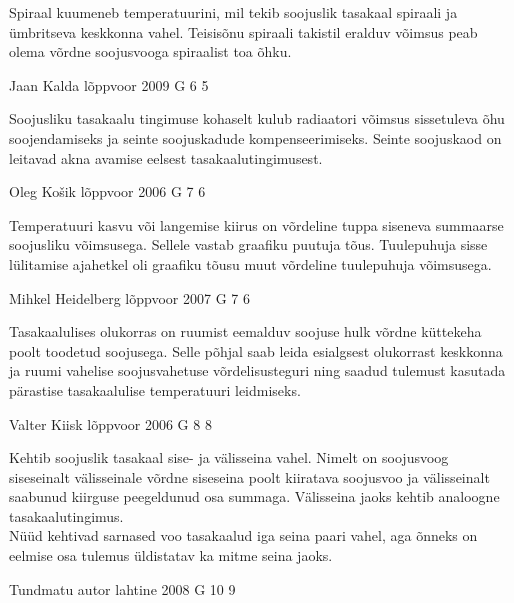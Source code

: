 \documentclass[11pt]{article}
\begin{document}
{{\ifHint
Spiraal kuumeneb temperatuurini, mil tekib soojuslik tasakaal spiraali ja ümbritseva keskkonna vahel. Teisisõnu spiraali takistil eralduv võimsus peab olema võrdne soojusvooga spiraalist toa õhku.
\fi
}

{Jaan Kalda} %
{lõppvoor} %
{2009} %
{G 6} %
{5} %
{

\ifHint
Soojusliku tasakaalu tingimuse kohaselt kulub radiaatori võimsus sissetuleva õhu soojendamiseks ja seinte soojuskadude kompenseerimiseks. Seinte soojuskaod on leitavad akna avamise eelsest tasakaalutingimusest.
\fi
}

{Oleg Košik} %
{lõppvoor} %
{2006} %
{G 7} %
{6} %
{

\ifHint
Temperatuuri kasvu või langemise kiirus on võrdeline tuppa siseneva summaarse soojusliku võimsusega. Sellele vastab graafiku puutuja tõus. Tuulepuhuja sisse lülitamise ajahetkel oli graafiku tõusu muut võrdeline tuulepuhuja võimsusega.
\fi
}

{Mihkel Heidelberg} %
{lõppvoor} %
{2007} %
{G 7} %
{6} %
{

\ifHint
Tasakaalulises olukorras on ruumist eemalduv soojuse hulk võrdne küttekeha poolt toodetud soojusega. Selle põhjal saab leida esialgsest olukorrast keskkonna ja ruumi vahelise soojusvahetuse võrdelisusteguri ning saadud tulemust kasutada pärastise tasakaalulise temperatuuri leidmiseks.
\fi
}

{Valter Kiisk} %
{lõppvoor} %
{2006} %
{G 8} %
{8} %
{

\ifHint
\osa Kehtib soojuslik tasakaal sise- ja välisseina vahel. Nimelt on soojusvoog siseseinalt välisseinale võrdne siseseina poolt kiiratava soojusvoo ja välisseinalt saabunud kiirguse peegeldunud osa summaga. Välisseina jaoks kehtib analoogne tasakaalutingimus.\\
\osa Nüüd kehtivad sarnased voo tasakaalud iga seina paari vahel, aga õnneks on eelmise osa tulemus üldistatav ka mitme seina jaoks.
\fi
}

{Tundmatu autor} %
{lahtine} %
{2008} %
{G 10} %
{9} %
{

}}
\end{document}
